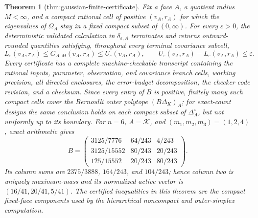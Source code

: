 \documentclass{article}
\newtheorem{theorem}{Theorem}
\begin{document}
\begin{theorem}[thm:gaussian-finite-certificate]\label{thm:gaussian-finite-certificate}
Fix a face \(A\), a quotient radius \(M<\infty\), and a compact rational cell of positive \((v_A,r_A)\) for which the eigenvalues of \(\Omega_A\) stay in a fixed compact subset of \((0,\infty)\).  For every \(\varepsilon>0\), the deterministic validated calculation in \(\delta_{\varepsilon,A}\) terminates and returns outward-rounded quantities satisfying, throughout every terminal covariance subcell,
\[
L_\varepsilon(v_A,r_A)\leq G_{A,M}(v_A,r_A)\leq U_\varepsilon(v_A,r_A),
\qquad U_\varepsilon(v_A,r_A)-L_\varepsilon(v_A,r_A)\leq\varepsilon.
\]
Every certificate has a complete machine-checkable transcript containing the rational inputs, parameter, observation, and covariance branch cells, working precision, all directed enclosures, the error-budget decomposition, the checker code revision, and a checksum.  Since every entry of \(B\) is positive, finitely many such compact cells cover the Bernoulli outer polytope \((B\Delta_K)_A\); for exact-count designs the same conclusion holds on each compact subset of \(\Delta_A^\circ\), but not uniformly up to its boundary.  For \(n=6\), \(A=\mathcal K\), and \((m_1,m_2,m_3)=(1,2,4)\), exact arithmetic gives
\[
B=\begin{pmatrix}3125/7776&64/243&4/243\\3125/15552&80/243&20/243\\125/15552&20/243&80/243\end{pmatrix}.
\]
Its column sums are \(2375/3888\), \(164/243\), and \(104/243\); hence column two is uniquely maximum-mass and its normalized active vector is \((16/41,20/41,5/41)\).  The certified inequalities in this theorem are the compact fixed-face components used by the hierarchical noncompact and outer-simplex computation.
\end{theorem}
\end{document}
